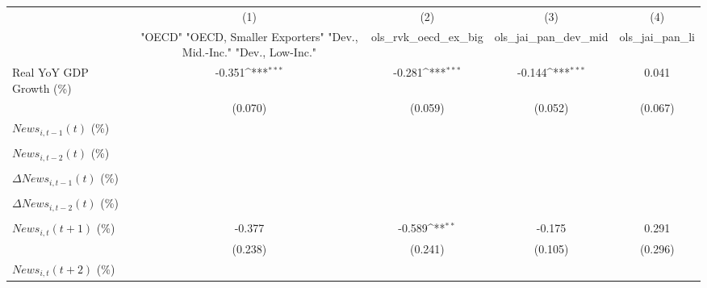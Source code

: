 {
\def\sym#1{\ifmmode^{#1}\else\(^{#1}\)\fi}
\begin{tabular}{l*{4}{c}}
\toprule
                    &\multicolumn{1}{c}{(1)}&\multicolumn{1}{c}{(2)}&\multicolumn{1}{c}{(3)}&\multicolumn{1}{c}{(4)}\\
                    &\multicolumn{1}{c}{ "OECD" "OECD, Smaller Exporters" "Dev., Mid.-Inc." "Dev., Low-Inc."}&\multicolumn{1}{c}{ols_rvk_oecd_ex_big}&\multicolumn{1}{c}{ols_jai_pan_dev_mid}&\multicolumn{1}{c}{ols_jai_pan_li}\\
\midrule
Real YoY GDP Growth (\%)&      -0.351\sym{***}&      -0.281\sym{***}&      -0.144\sym{***}&       0.041         \\
                    &     (0.070)         &     (0.059)         &     (0.052)         &     (0.067)         \\
\addlinespace
$ News_{i,t-1}(t)$ (\%)&                     &                     &                     &                     \\
                    &                     &                     &                     &                     \\
\addlinespace
$ News_{i,t-2}(t)$ (\%)&                     &                     &                     &                     \\
                    &                     &                     &                     &                     \\
\addlinespace
$ \Delta News_{i,t-1}(t)$ (\%)&                     &                     &                     &                     \\
                    &                     &                     &                     &                     \\
\addlinespace
$ \Delta News_{i,t-2}(t)$ (\%)&                     &                     &                     &                     \\
                    &                     &                     &                     &                     \\
\addlinespace
$ News_{i,t}(t+1)$ (\%)&      -0.377         &      -0.589\sym{**} &      -0.175         &       0.291         \\
                    &     (0.238)         &     (0.241)         &     (0.105)         &     (0.296)         \\
\addlinespace
$ News_{i,t}(t+2)$ (\%)&                     &                     &                     &                     \\

\end{tabular}}
